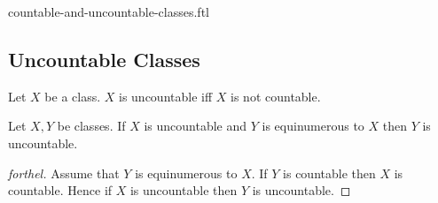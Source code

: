 \documentclass{naproche-library}
\begin{document}
\begin{smodule}{countable-and-uncountable-classes.ftl}
  \subsection*{Uncountable Classes}

  \begin{definition}[forthel,id=FOUNDATIONS_14_2411928395710464,printid]
    Let $X$ be a class.
    $X$ is uncountable iff $X$ is not countable.
  \end{definition}

  \begin{proposition}[forthel,id=FOUNDATIONS_14_1073385358491648,printid]
    Let $X, Y$ be classes.
    If $X$ is uncountable and $Y$ is equinumerous to $X$ then $Y$ is uncountable.
  \end{proposition}
  \begin{proof}[forthel]
    Assume that $Y$ is equinumerous to $X$.
    If $Y$ is countable then $X$ is countable.
    Hence if $X$ is uncountable then $Y$ is uncountable.
  \end{proof}
\end{smodule}
\end{document}
